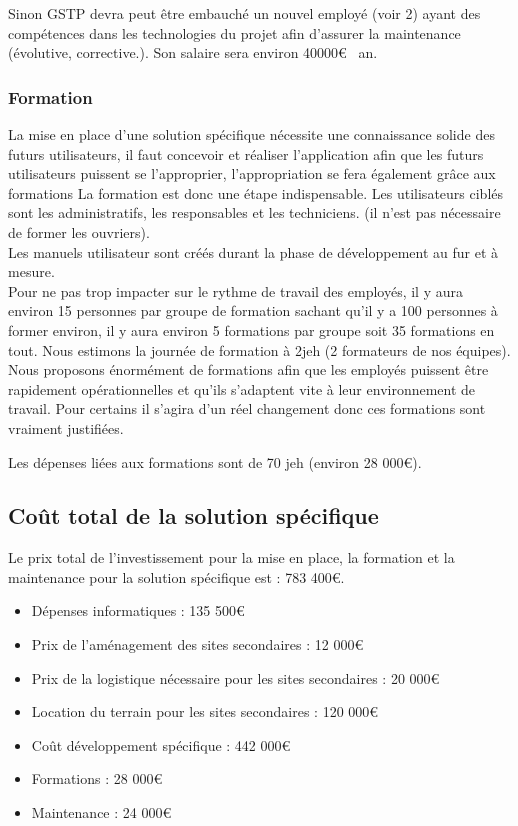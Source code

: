     Sinon GSTP devra peut être embauché un nouvel employé (voir 2) ayant des compétences dans les technologies du projet afin d'assurer la maintenance (évolutive, corrective.). Son salaire sera environ 40000€ \ an.\\

    \subsubsection{Formation}
        La mise en place d'une solution spécifique nécessite une connaissance solide des futurs utilisateurs, il faut concevoir et réaliser l'application afin que les futurs utilisateurs puissent se l'approprier, l'appropriation se fera également grâce aux formations
          La formation est donc une étape indispensable. Les utilisateurs ciblés sont les administratifs, les responsables et les techniciens. (il n'est pas nécessaire de former les ouvriers).\\

    Les manuels utilisateur sont créés durant la phase de développement au fur et à mesure.\\

    Pour ne pas trop impacter sur le rythme de travail des employés, il y aura environ 15 personnes par groupe de formation sachant qu'il y a 100 personnes à former  environ, il y aura environ 5 formations par groupe soit 35 formations en tout.
    Nous estimons la journée de formation à 2jeh (2 formateurs de nos équipes). Nous proposons énormément de formations afin que les employés puissent être rapidement opérationnelles et qu'ils s'adaptent vite à leur environnement de travail. Pour certains il s'agira d'un réel changement donc ces formations sont vraiment justifiées.

    Les dépenses liées aux formations sont de 70 jeh (environ 28 000€).

    \subsection{Coût total de la solution spécifique}

    Le prix total de l'investissement pour la mise en place, la formation et la maintenance pour la solution spécifique est : 783 400€.
    \begin{itemize}
          \item Dépenses informatiques : 135 500€
          \item Prix de l'aménagement des sites secondaires : 12 000€
          \item Prix de la logistique nécessaire pour les sites secondaires : 20 000€
          \item Location du terrain pour les sites secondaires : 120 000€
          \item Coût développement spécifique : 442 000€
          \item Formations : 28 000€
          \item Maintenance : 24 000€
    \end{itemize}
    
